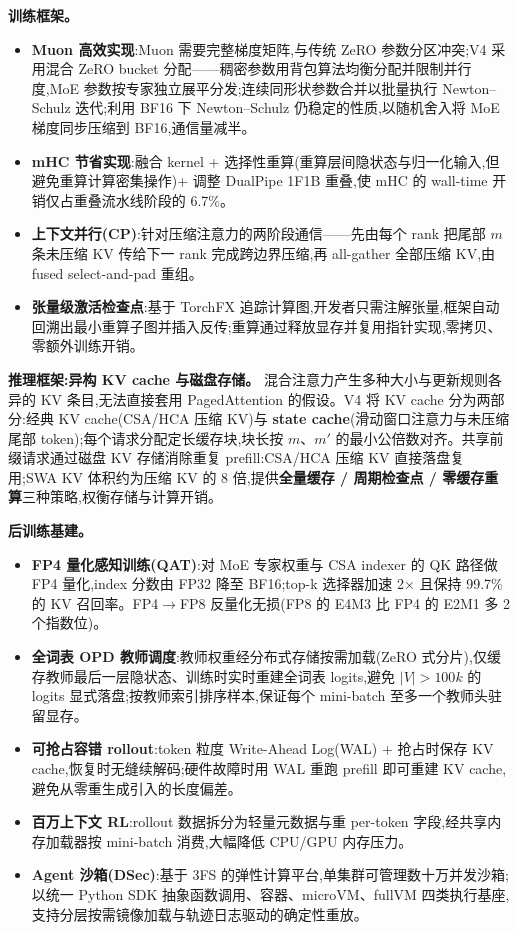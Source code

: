 \documentclass{MathNoteCN}
\begin{document}
\textbf{训练框架。}
\begin{itemize}
  \item \textbf{Muon 高效实现}:Muon 需要完整梯度矩阵,与传统 ZeRO 参数分区冲突;V4 采用混合 ZeRO bucket 分配——稠密参数用背包算法均衡分配并限制并行度,MoE 参数按专家独立展平分发;连续同形状参数合并以批量执行 Newton--Schulz 迭代;利用 BF16 下 Newton--Schulz 仍稳定的性质,以随机舍入将 MoE 梯度同步压缩到 BF16,通信量减半。
  \item \textbf{mHC 节省实现}:融合 kernel + 选择性重算(重算层间隐状态与归一化输入,但避免重算计算密集操作)+ 调整 DualPipe 1F1B 重叠,使 mHC 的 wall-time 开销仅占重叠流水线阶段的 6.7\%。
  \item \textbf{上下文并行(CP)}:针对压缩注意力的两阶段通信——先由每个 rank 把尾部 $m$ 条未压缩 KV 传给下一 rank 完成跨边界压缩,再 all-gather 全部压缩 KV,由 fused select-and-pad 重组。
  \item \textbf{张量级激活检查点}:基于 TorchFX 追踪计算图,开发者只需注解张量,框架自动回溯出最小重算子图并插入反传;重算通过释放显存并复用指针实现,零拷贝、零额外训练开销。
\end{itemize}

\textbf{推理框架:异构 KV cache 与磁盘存储。} 混合注意力产生多种大小与更新规则各异的 KV 条目,无法直接套用 PagedAttention 的假设。V4 将 KV cache 分为两部分:经典 KV cache(CSA/HCA 压缩 KV)与 \textbf{state cache}(滑动窗口注意力与未压缩尾部 token);每个请求分配定长缓存块,块长按 $m$、$m'$ 的最小公倍数对齐。共享前缀请求通过磁盘 KV 存储消除重复 prefill:CSA/HCA 压缩 KV 直接落盘复用;SWA KV 体积约为压缩 KV 的 8 倍,提供\textbf{全量缓存 / 周期检查点 / 零缓存重算}三种策略,权衡存储与计算开销。

\textbf{后训练基建。}
\begin{itemize}
  \item \textbf{FP4 量化感知训练(QAT)}:对 MoE 专家权重与 CSA indexer 的 QK 路径做 FP4 量化,index 分数由 FP32 降至 BF16;top-k 选择器加速 2$\times$ 且保持 99.7\% 的 KV 召回率。FP4$\to$FP8 反量化无损(FP8 的 E4M3 比 FP4 的 E2M1 多 2 个指数位)。
  \item \textbf{全词表 OPD 教师调度}:教师权重经分布式存储按需加载(ZeRO 式分片),仅缓存教师最后一层隐状态、训练时实时重建全词表 logits,避免 $|V|>100k$ 的 logits 显式落盘;按教师索引排序样本,保证每个 mini-batch 至多一个教师头驻留显存。
  \item \textbf{可抢占容错 rollout}:token 粒度 Write-Ahead Log(WAL) + 抢占时保存 KV cache,恢复时无缝续解码;硬件故障时用 WAL 重跑 prefill 即可重建 KV cache,避免从零重生成引入的长度偏差。
  \item \textbf{百万上下文 RL}:rollout 数据拆分为轻量元数据与重 per-token 字段,经共享内存加载器按 mini-batch 消费,大幅降低 CPU/GPU 内存压力。
  \item \textbf{Agent 沙箱(DSec)}:基于 3FS 的弹性计算平台,单集群可管理数十万并发沙箱;以统一 Python SDK 抽象函数调用、容器、microVM、fullVM 四类执行基座,支持分层按需镜像加载与轨迹日志驱动的确定性重放。
\end{itemize}
\end{document}
